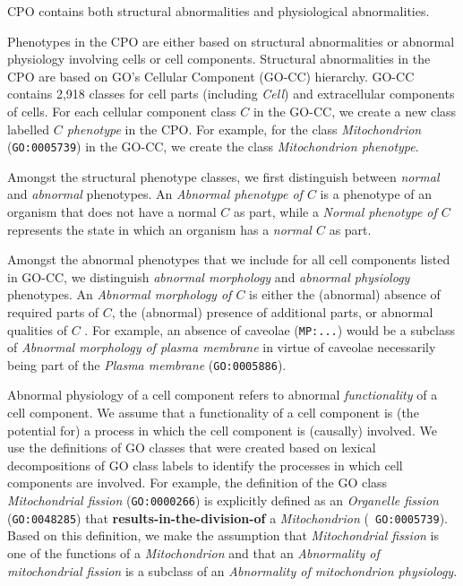 \documentclass{bioinfo}
\renewcommand{\cite}{\citep}
\begin{document}
CPO contains both structural abnormalities and physiological
abnormalities.

Phenotypes in the CPO are either based on structural abnormalities or
abnormal physiology involving cells or cell components. Structural
abnormalities in the CPO are based on GO's Cellular Component (GO-CC)
hierarchy. GO-CC contains 2,918 classes for cell parts (including {\em
  Cell}) and extracellular components of cells. For each cellular
component class $C$ in the GO-CC, we create a new class labelled {\em
  $C$ phenotype} in the CPO. For example, for the class {\em
  Mitochondrion} ({\tt GO:0005739}) in the GO-CC, we create the class
{\em Mitochondrion phenotype}.

Amongst the structural phenotype classes, we first distinguish between
{\em normal} and {\em abnormal} phenotypes. An {\em Abnormal phenotype
  of $C$} is a phenotype of an organism that does not have a normal
$C$ as part, while a {\em Normal phenotype of $C$} represents the
state in which an organism has a {\em normal $C$} as part.

Amongst the abnormal phenotypes that we include for all cell
components listed in GO-CC, we distinguish {\em abnormal morphology}
and {\em abnormal physiology} phenotypes. An {\em Abnormal morphology
  of $C$} is either the (abnormal) absence of required parts of $C$,
the (abnormal) presence of additional parts, or abnormal qualities of
$C$ \cite{Hoehndorf2010phene}. For example, an absence of caveolae
({\tt MP:...}) would be a subclass of {\em Abnormal morphology of
  plasma membrane} in virtue of caveolae necessarily being part of the
{\em Plasma membrane} ({\tt GO:0005886}).

Abnormal physiology of a cell component refers to abnormal {\em
  functionality} of a cell component. We assume that a functionality
of a cell component is (the potential for) a process in which the cell
component is (causally) involved. We use the definitions of GO classes
that were created based on lexical decompositions of GO class labels
\cite{Mungall2010go, Bada2007a, Ogren2004} to identify the processes
in which cell components are involved. For example, the definition of
the GO class {\em Mitochondrial fission} ({\tt GO:0000266}) is
explicitly defined as an {\em Organelle fission} ({\tt GO:0048285})
that {\bf results-in-the-division-of} a {\em Mitochondrion} ({\tt
  GO:0005739}). Based on this definition, we make the assumption that
{\em Mitochondrial fission} is one of the functions of a {\em
  Mitochondrion} and that an {\em Abnormality of mitochondrial
  fission} is a subclass of an {\em Abnormality of mitochondrion
  physiology}.
\end{document}
